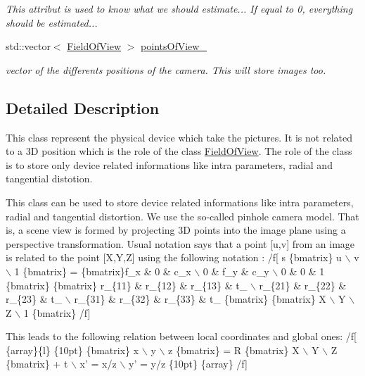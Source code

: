 \begin{DoxyCompactItemize}
\begin{DoxyCompactList}\small\item\em This attribut is used to know what we should estimate... If equal to 0, everything should be estimated... \end{DoxyCompactList}\item 
\hypertarget{class_opencv_sf_m_1_1_camera_aa12601d4d667646d9be47e5355eebe04}{
std::vector$<$ \hyperlink{class_opencv_sf_m_1_1_field_of_view}{FieldOfView} $>$ \hyperlink{class_opencv_sf_m_1_1_camera_aa12601d4d667646d9be47e5355eebe04}{pointsOfView\_\-}}
\label{class_opencv_sf_m_1_1_camera_aa12601d4d667646d9be47e5355eebe04}

\begin{DoxyCompactList}\small\item\em vector of the differents positions of the camera. This will store images too. \end{DoxyCompactList}\end{DoxyCompactItemize}


\subsection{Detailed Description}
This class represent the physical device which take the pictures. It is not related to a 3D position which is the role of the class \hyperlink{class_opencv_sf_m_1_1_field_of_view}{FieldOfView}. The role of the class is to store only device related informations like intra parameters, radial and tangential distotion. 

This class can be used to store device related informations like intra parameters, radial and tangential distortion. We use the so-\/called pinhole camera model. That is, a scene view is formed by projecting 3D points into the image plane using a perspective transformation. Usual notation says that a point \mbox{[}u,v\mbox{]} from an image is related to the point \mbox{[}X,Y,Z\mbox{]} using the following notation : /f\mbox{[} s \{bmatrix\} u $\backslash$ v $\backslash$ 1 \{bmatrix\} = \{bmatrix\}f\_\-x \& 0 \& c\_\-x $\backslash$ 0 \& f\_\-y \& c\_\-y $\backslash$ 0 \& 0 \& 1 \{bmatrix\} \{bmatrix\} r\_\-\{11\} \& r\_\-\{12\} \& r\_\-\{13\} \& t\_ $\backslash$ r\_\-\{21\} \& r\_\-\{22\} \& r\_\-\{23\} \& t\_ $\backslash$ r\_\-\{31\} \& r\_\-\{32\} \& r\_\-\{33\} \& t\_ \{bmatrix\} \{bmatrix\} X $\backslash$ Y $\backslash$ Z $\backslash$ 1 \{bmatrix\} /f\mbox{]}

This leads to the following relation between local coordinates and global ones: /f\mbox{[} \{array\}\{l\} \{10pt\} \{bmatrix\} x $\backslash$ y $\backslash$ z \{bmatrix\} = R \{bmatrix\} X $\backslash$ Y $\backslash$ Z \{bmatrix\} + t $\backslash$ x' = x/z $\backslash$ y' = y/z \{10pt\} \{array\} /f\mbox{]}

